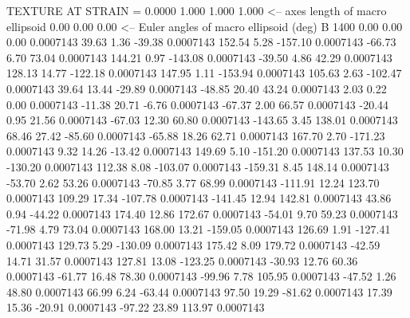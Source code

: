 TEXTURE AT STRAIN =    0.0000
   1.000   1.000   1.000  <-- axes length of macro ellipsoid
    0.00    0.00    0.00  <-- Euler angles of macro ellipsoid (deg)
B      1400
        0.00        0.00        0.00     0.0007143
       39.63        1.36      -39.38     0.0007143
      152.54        5.28     -157.10     0.0007143
      -66.73        6.70       73.04     0.0007143
      144.21        0.97     -143.08     0.0007143
      -39.50        4.86       42.29     0.0007143
      128.13       14.77     -122.18     0.0007143
      147.95        1.11     -153.94     0.0007143
      105.63        2.63     -102.47     0.0007143
       39.64       13.44      -29.89     0.0007143
      -48.85       20.40       43.24     0.0007143
        2.03        0.22        0.00     0.0007143
      -11.38       20.71       -6.76     0.0007143
      -67.37        2.00       66.57     0.0007143
      -20.44        0.95       21.56     0.0007143
      -67.03       12.30       60.80     0.0007143
     -143.65        3.45      138.01     0.0007143
       68.46       27.42      -85.60     0.0007143
      -65.88       18.26       62.71     0.0007143
      167.70        2.70     -171.23     0.0007143
        9.32       14.26      -13.42     0.0007143
      149.69        5.10     -151.20     0.0007143
      137.53       10.30     -130.20     0.0007143
      112.38        8.08     -103.07     0.0007143
     -159.31        8.45      148.14     0.0007143
      -53.70        2.62       53.26     0.0007143
      -70.85        3.77       68.99     0.0007143
     -111.91       12.24      123.70     0.0007143
      109.29       17.34     -107.78     0.0007143
     -141.45       12.94      142.81     0.0007143
       43.86        0.94      -44.22     0.0007143
      174.40       12.86      172.67     0.0007143
      -54.01        9.70       59.23     0.0007143
      -71.98        4.79       73.04     0.0007143
      168.00       13.21     -159.05     0.0007143
      126.69        1.91     -127.41     0.0007143
      129.73        5.29     -130.09     0.0007143
      175.42        8.09      179.72     0.0007143
      -42.59       14.71       31.57     0.0007143
      127.81       13.08     -123.25     0.0007143
      -30.93       12.76       60.36     0.0007143
      -61.77       16.48       78.30     0.0007143
      -99.96        7.78      105.95     0.0007143
      -47.52        1.26       48.80     0.0007143
       66.99        6.24      -63.44     0.0007143
       97.50       19.29      -81.62     0.0007143
       17.39       15.36      -20.91     0.0007143
      -97.22       23.89      113.97     0.0007143
